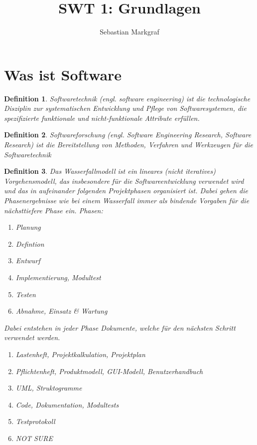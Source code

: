 \documentclass[a4paper]{article}
\title{SWT 1: Grundlagen}
\author{Sebastian Markgraf}
\theoremstyle{break}
\newtheorem{defi}{Definition}[section]
\begin{document}
\maketitle
\section {Was ist Software}
\begin {defi}
  Softwaretechnik (engl. software engineering) ist die technologische Disziplin zur systematischen Entwicklung und Pflege von Softwaresystemen, die spezifizierte funktionale und nicht-funktionale Attribute erfüllen.
\end {defi}

\begin {defi}
  Softwareforschung (engl. Software Engineering Research, Software Research) ist die Bereitstellung von Methoden, Verfahren und Werkzeugen für die Softwaretechnik
\end {defi}


\begin {defi}
  Das Wasserfallmodell ist ein lineares (nicht iteratives) Vorgehensmodell, das insbesondere für die Softwareentwicklung verwendet wird und das in aufeinander folgenden Projektphasen organisiert ist. Dabei gehen die Phasenergebnisse wie bei einem Wasserfall immer als bindende Vorgaben für die nächsttiefere Phase ein.
  Phasen:
  \begin {enumerate}
  \item Planung
  \item Defintion
  \item Entwurf
  \item Implementierung, Modultest
  \item Testen
  \item Abnahme, Einsatz \& Wartung
  \end {enumerate}
  Dabei entstehen in jeder Phase Dokumente, welche für den nächsten Schritt verwendet werden.
  \begin {enumerate}
  \item Lastenheft, Projektkalkulation, Projektplan
  \item Pflichtenheft, Produktmodell, GUI-Modell, Benutzerhandbuch
  \item UML, Struktogramme
  \item Code, Dokumentation, Modultests
  \item Testprotokoll
  \item NOT SURE
    \end {enumerate}

  
  \end {defi}
\end{document}
